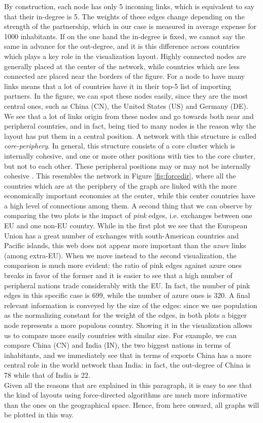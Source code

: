 By construction, each node has only 5 incoming links, which is equivalent to say that their in-degree is 5. The weights of these edges change depending on the strength of the partnership, which in our case is measured in average expense for 1000 inhabitants. If on the one hand the in-degree is fixed, we cannot say the same in advance for the out-degree, and it is this difference across countries which plays a key role in the visualization layout. Highly connected nodes are generally placed at the center of the network, while countries which are less connected are placed near the borders of the figure. For a node to have many links means that a lot of countries have it in their top-5 list of importing partners. In the figure, we can spot these nodes easily, since they are the most central ones, such as China (CN), the United States (US) and Germany (DE). We see that a lot of links origin from these nodes and go towards both near and peripheral countries, and in fact, being tied to many nodes is the reason why the layout has put them in a central position. A network with this structure is called \textit{core-periphery}. In general, this structure consists of a core cluster which is internally cohesive, and one or more other positions with ties to the core cluster, but not to each other. These peripheral positions may or may not be internally cohesive \cite{wasserman1994social}. This resembles the network in Figure \ref{fig:forcedir}, where all the countries which are at the periphery of the graph are linked with the more economically important economies at the center, while this center countries have a high level of connections among them.
A second thing that we can observe by comparing the two plots is the impact of \textit{pink} edges, i.e. exchanges between one EU and one non-EU country. While in the first plot we see that the European Union has a great number of exchanges with south-American countries and Pacific islands, this web does not appear more important than the \textit{azure} links (among extra-EU). When we move instead to the second visualization, the comparison is much more evident: the ratio of pink edges against azure ones breaks in favor of the former and it is easier to see that a high number of peripheral nations trade considerably with the EU. In fact, the number of pink edges in this specific case is 699, while the number of azure ones is 320. 
A final relevant information is conveyed by the size of the edges: since we use population as the normalizing constant for the weight of the edges, in both plots a bigger node represents a more populous country. Showing it in the visualization allows us to compare more easily countries with similar size. For example, we can compare China (CN) and India (IN), the two biggest nations in terms of inhabitants, and we immediately see that in terms of exports China has a more central role in the world network than India: in fact, the out-degree of China is 78 while that of India is 22.\\
Given all the reasons that are explained in this paragraph, it is easy to see that the kind of layouts using force-directed algorithms are much more informative than the ones on the geographical space. Hence, from here onward, all graphs will be plotted in this way.




